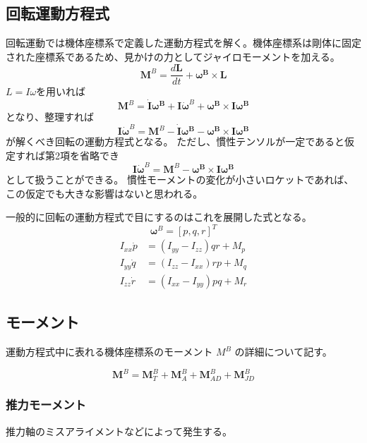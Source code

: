 ﻿\documentclass[a4paper]{jsarticle}
\begin{document}
\subsection{回転運動方程式}
回転運動では機体座標系で定義した運動方程式を解く。機体座標系は剛体に固定された座標系であるため、見かけの力としてジャイロモーメントを加える。
\begin{equation}
\bm{M}^B = \frac{d\bm{L}}{dt} + \bm{\omega^B} \times \bm{L}
\end{equation}
$L = I \omega$を用いれば
\begin{equation}
\bm{M}^B = 
\dot{\bm{I}} \bm{\omega^B}
+ \bm{I} \dot{\bm{\omega}}^B
+ \bm{\omega^B} \times \bm{I} \bm{\omega^B}
\end{equation}
となり、整理すれば
\begin{equation}
\bm{I} \dot{\bm{\omega}}^B = 
\bm{M}^B
- \dot{\bm{I}} \bm{\omega^B}
- \bm{\omega^B} \times \bm{I} \bm{\omega^B}
\end{equation}
が解くべき回転の運動方程式となる。
ただし、慣性テンソルが一定であると仮定すれば第2項を省略でき
\begin{equation}
\bm{I} \dot{\bm{\omega}}^B = 
\bm{M}^B
- \bm{\omega^B} \times \bm{I} \bm{\omega^B}
\end{equation}
として扱うことができる。
慣性モーメントの変化が小さいロケットであれば、この仮定でも大きな影響はないと思われる。

一般的に回転の運動方程式で目にするのはこれを展開した式となる。
\begin{equation}
\bm{\omega}^B = [p, q, r]^T
\end{equation}
\begin{eqnarray}
I_{xx} \dot{p} &= (I_{yy}-I_{zz})qr+M_p \\
I_{yy} \dot{q} &= (I_{zz}-I_{xx})rp+M_q \\
I_{zz} \dot{r} &= (I_{xx}-I_{yy})pq+M_r
\end{eqnarray}

\subsection{モーメント}
運動方程式中に表れる機体座標系のモーメント $M^B$ の詳細について記す。

\begin{equation}
\bm{M}^B = \bm{M}^B_T + \bm{M}^B_A + \bm{M}^B_{AD} + \bm{M}^B_{JD}
\end{equation}

\subsubsection{推力モーメント}
推力軸のミスアライメントなどによって発生する。
\end{document}
